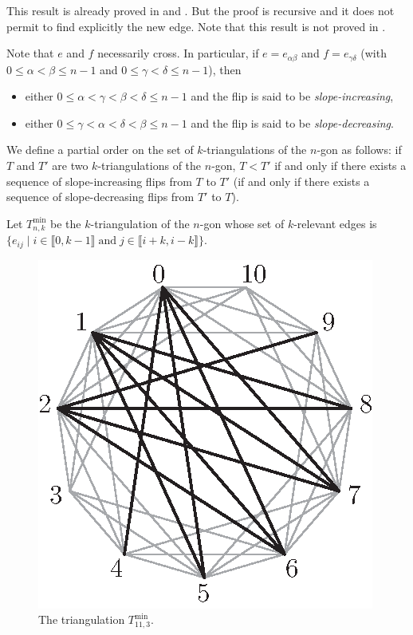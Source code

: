 \documentclass[12pt]{amsart}
\begin{document}
\begin{bibremark}
This result is already proved in \cite{n-gdfcp-00} and \cite{j-gt}. But the proof is recursive and it does not permit to find explicitly the new edge. Note that this result is not proved in \cite{dkm-lahp-02}.

\end{bibremark}



Note that $e$ and $f$ necessarily cross.
In particular, if $e=e_{\alpha\beta}$ and $f=e_{\gamma\delta}$ (with $0\le\alpha<\beta\le n-1$ and $0\le\gamma<\delta\le n-1$), then
\begin{itemize}
\item either $0\le\alpha<\gamma<\beta<\delta\le n-1$ and the flip is said to be \emph{slope-increasing},
\item either $0\le\gamma<\alpha<\delta<\beta\le n-1$ and the flip is said to be \emph{slope-decreasing}.
\end{itemize}
We define a partial order on the set of $k$-triangulations of the $n$-gon as follows: if $T$ and $T'$ are two $k$-triangulations of the $n$-gon, $T<T'$ if and only if there exists a sequence of slope-increasing flips from $T$ to $T'$ (if and only if there exists a sequence of slope-decreasing flips from $T'$ to $T$).

Let $T_{n,k}^{\min}$ be the $k$-triangulation of the $n$-gon whose set of $k$-relevant edges is $\{e_{ij}\;|\;i\in\llbracket 0,k-1\rrbracket\;\mathrm{and}\;j\in\llbracket i+k,i-k\rrbracket\}$.

\begin{figure}
\centerline{\includegraphics[scale=1]{min.eps}}
\caption{\small{The triangulation $T_{11,3}^{\min}$.}}\label{min}
\end{figure}
\end{document}
